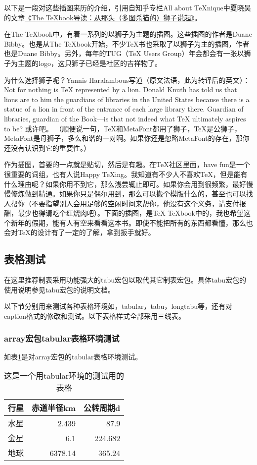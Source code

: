 以下是一段对这些插图来历的介绍，引用自知乎专栏All about TeXnique中夏晓昊的文章\href{http://zhuanlan.zhihu.com/LaTeX/19669122}{《The TeXbook导读：从那头（多图杀猫的）狮子说起》}。

在The TeXbook中，有着一系列的以狮子为主题的插图。这些插图的作者是Duane Bibby。也是从The TeXbook开始，不少TeX书也采取了以狮子为主的插图，作者也是Duane Bibby。另外，每年的TUG（TeX Users Group）年会都会有一张以狮子为主题的logo，这只狮子已经是社区的吉祥物了。

为什么选择狮子呢？Yannis Haralambous写道（原文法语，此为转译后的英文）：Not for nothing is TeX represented by a lion. Donald Knuth has told us that lions are to him the guardians of libraries in the United States because there is a statue of a lion in front of the entrance of each large library there. Guardian of libraries, guardian of the Book—is that not indeed what TeX ultimately aspires to be? 或许吧。 （顺便说一句，TeX和MetaFont都用了狮子，TeX是公狮子，MetaFont是母狮子，多么和谐的一对啊。如果你还是忽略MetaFont的存在，那你还没有认识到它的重要性。）

作为插图，首要的一点就是贴切，然后是有趣。在TeX社区里面，have fun是一个很重要的词组，也有人说Happy TeXing。我知道有不少人不喜欢TeX，但是能有什么理由呢？如果你用不到它，那么浅尝辄止即可。如果你会用到很频繁，最好慢慢修炼做到精通。如果你只是偶尔用到，那么可以搬个模版什么的，甚至也可以找人帮你（不要指望别人会用足够的空闲时间来帮你，他没有这个义务，请支付报酬，最少也得请吃个红烧肉吧）。下面的插图，是TeX TeXbook中的，我也希望这个新年的假期，能有人有空来看看这本书。即使不能把所有的东西都看懂，那么也会对TeX的设计有了一定的了解，拿到扳手就好。

\subsection{表格测试}
在这里推荐制表采用功能强大的tabu宏包以取代其它制表宏包。具体tabu宏包的使用说明参见tabu宏包的说明文档。

以下节分别用来测试各种表格环境如，tabular，tabu，longtabu等，还有对caption格式的修改和测试。以下表格样式全部采用三线表。

\subsubsection{array宏包tabular表格环境测试}
如表\ref{tab:first_table_test}是对array宏包的tabular表格环境测试。
\begin{table}[htbp]
	\centering
	\caption{这是一个用tabular环境的测试用的表格}\label{tab:first_table_test}
    \begin{tabular}{lrr}
    \toprule
    \textbf{行星}     & \textbf{赤道半径}km & \textbf{公转周期}d \\
    \midrule
    水星     & 2.439  & 87.9 \\
    金星     & 6.1    & 224.682 \\
    地球     & 6378.14 & 365.24 \\
    \bottomrule
    \end{tabular}%
\end{table}

